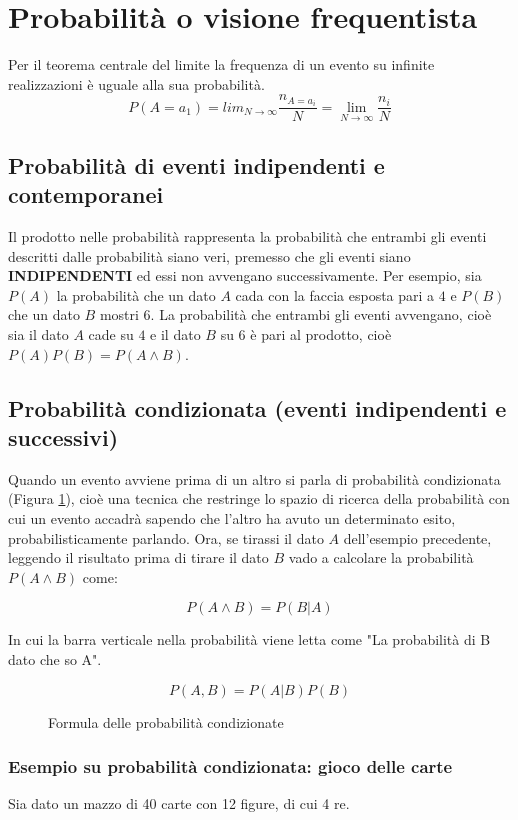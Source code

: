 \documentclass[\main/main.tex]{subfiles}
\begin{document}
\section{Probabilità o visione frequentista}
Per il teorema centrale del limite la frequenza di un evento su infinite realizzazioni è uguale alla sua probabilità.
\[
  P(A=a_1) = lim_{N\rightarrow \infty} \dfrac{n_{A=a_i}}{N} = \lim_{N\rightarrow \infty} \dfrac{n_i}{N}
\]

\subsection{Probabilità di eventi indipendenti e contemporanei}
Il prodotto nelle probabilità rappresenta la probabilità che entrambi gli eventi descritti dalle probabilità siano veri, premesso che gli eventi siano \textbf{INDIPENDENTI} ed essi non avvengano successivamente.
Per esempio, sia $P(A)$ la probabilità che un dato $A$ cada con la faccia esposta pari a $4$ e $P(B)$ che un dato $B$ mostri $6$. La probabilità che entrambi gli eventi avvengano, cioè sia il dato $A$ cade su $4$ e il dato $B$ su $6$ è pari al prodotto, cioè $P(A)P(B) = P(A \wedge B)$.

\subsection{Probabilità condizionata (eventi indipendenti e successivi)}
Quando un evento avviene prima di un altro si parla di probabilità condizionata (Figura \ref{probCond}), cioè una tecnica che restringe lo spazio di ricerca della probabilità con cui un evento accadrà sapendo che l'altro ha avuto un determinato esito, probabilisticamente parlando. Ora, se tirassi il dato $A$ dell'esempio precedente, leggendo il risultato prima di tirare il dato $B$ vado a calcolare la probabilità $P(A \wedge B)$ come:

\[
  P(A \wedge B) = P(B | A)
\]

In cui la barra verticale nella probabilità viene letta come "La probabilità di B dato che so A".

\begin{figure}[H]
  \[
    P(A, B) = P(A|B) P(B)
  \]
  \caption{Formula delle probabilità condizionate}
  \label{probCond}
\end{figure}

\subsubsection{Esempio su probabilità condizionata: gioco delle carte}
Sia dato un mazzo di 40 carte con 12 figure, di cui 4 re.
\end{document}
